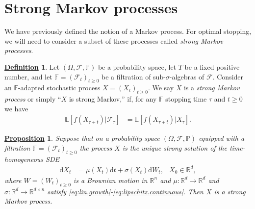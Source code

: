 \documentclass[12pt]{book}
\numberwithin{equation}{chapter}
\theoremstyle{plain}
\numberwithin{theorem}{section}
\newtheorem{proposition}[theorem]{\underline{Proposition}}
\theoremstyle{definition}
\newtheorem{definition}[theorem]{\underline{Definition}}
\numberwithin{exercise}{chapter}
\newcommand{\<}{\langle}
\renewcommand{\>}{\rangle}
\renewcommand{\(}{\left(}
\renewcommand{\)}{\right)}
\renewcommand{\[}{\left[}
\renewcommand{\]}{\right]}
\newcommand\Eb{\mathds{E}}
\newcommand\Fb{\mathds{F}}
\newcommand\Ib{\mathds{1}} 	%
\newcommand\Pb{\mathds{P}}
\newcommand\Rb{\mathds{R}}
\newcommand\Fc{\mathscr{F}}
\newcommand\Om{\Omega}
\newcommand\sig{\sigma}
\newcommand\dd{\mathrm{d}}
\begin{document}
%
%
%
\section{Strong Markov processes}
\label{sec:strong.markov}
We have previously defined the notion of a Markov process.  For optimal stopping, we will need to consider a subset of these processes called \emph{strong Markov processes}.

\begin{definition}
\label{def:strong.markov}
Let  $(\Om,\Fc,\Pb)$  be a probability space, let $T$ be a fixed positive number, and let $\Fb=(\Fc_t)_{t \geq 0}$ be a filtration of sub-$\sig$-algebras of $\Fc$.
Consider an $\Fb$-adapted stochastic process $X=(X_t)_{t \geq 0}$. 
We say $X$ is a \emph{strong Markov process} or simply ``$X$ is strong Markov,'' if, for any $\Fb$ stopping time $\tau$ and $t \geq 0$ we have
\begin{align}
\Eb[ f(X_{\tau+t}) | \Fc_\tau ]
	&=	\Eb[ f(X_{\tau+t}) | X_\tau ] .
\end{align}
\end{definition}

\begin{proposition}
Suppose that on a probability space $(\Om,\Fc,\Pb)$ equipped with a filtration $\Fb = (\Fc_t)_{t \geq 0}$ the process $X$ is the unique strong solution of the time-homogeneous SDE
\begin{align}
\dd X_t
	&=	\mu(X_t) \dd t + \sig( X_t) \dd W_t , &
X_0
	\in \Rb^d ,
\end{align}
where $W = (W_t)_{t \geq 0}$ is a Brownian motion in $\Rb^n$ and $\mu : \Rb^d \to \Rb^d$ and $\sig : \Rb^d \to \Rb^{d \times n}$ satisfy \eqref{eq:lin.growth}-\eqref{eq:lipschitz.continuous}.  Then $X$ is a strong Markov process.
\end{proposition}
\end{document}
